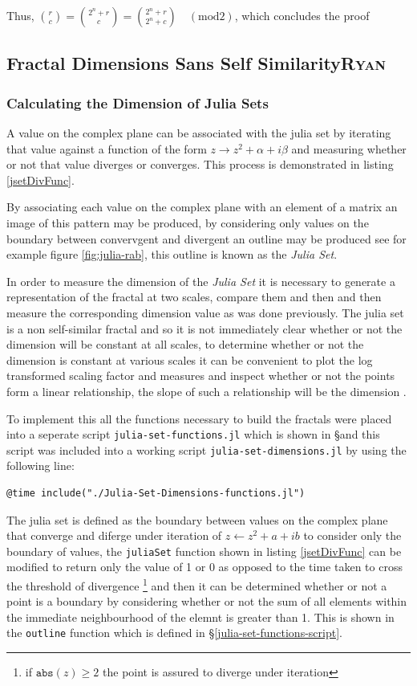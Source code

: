 \documentclass[a4paper,11pt,twoside]{article}
\begin{document}
Thus, \(\binom{r}{c} = \binom{2^n + r}{c} = \binom{2^n + r}{2^n + c} \quad (\text{mod} 2)\), which concludes the proof

\subsection{Fractal Dimensions Sans Self Similarity\hfill{}\textsc{Ryan}}
\label{sec:org7883f11}
\subsubsection{Calculating the Dimension of Julia Sets}
\label{jl-set-dim}
A value on the complex plane can be associated with the julia set by iterating
that value against a function of the form \(z \rightarrow z^{2} + \alpha + i
\beta\) and measuring whether or not that value diverges or converges. This
process is demonstrated in listing \ref{jsetDivFunc}.

By associating each value on the complex plane with an element of a matrix an image of this pattern may be produced, by considering only values on the boundary between convervgent and divergent an outline may be produced see for example figure \ref{fig:julia-rab}, this outline is known as the \emph{Julia Set}.

In order to measure the dimension of the \emph{Julia Set} it is necessary to generate
a representation of the fractal at two scales, compare them and then and then
measure the corresponding dimension value as was done previously. The julia set
is a non self-similar fractal and so it is not immediately clear whether or not
the dimension will be constant at all scales, to determine whether or not the
dimension is constant at various scales it can be convenient to plot the log
transformed scaling factor and measures and inspect whether or not the points
form a linear relationship, the slope of such a relationship will be the
dimension \cite[p. 30]{vicsekFractalGrowthPhenomena1992}.

To implement this all the functions necessary to build the fractals were placed into a seperate script \texttt{julia-set-functions.jl} which is shown in \S and this script was included into a working script \texttt{julia-set-dimensions.jl} by using the following line:

\begin{verbatim}
@time include("./Julia-Set-Dimensions-functions.jl")
\end{verbatim}


The julia set is defined as the boundary between values on the complex plane that converge and diferge under iteration of \(z\leftarrow z^{2} + a+ib\) to consider only the boundary of values, the \texttt{juliaSet} function shown in  listing \ref{jsetDivFunc} can be modified to return only the value of 1 or 0 as opposed to the time taken to cross the threshold of divergence \footnote{if \(\mathtt{abs}\left(z\right) \geq 2\) the point is assured to diverge under iteration} and then it can be determined whether or not a point is a boundary by considering whether or not the sum of all elements within the immediate neighbourhood of the elemnt is greater than 1. This is shown in the \texttt{outline} function which is defined in \S \ref{julia-set-functions-script}.
\end{document}
